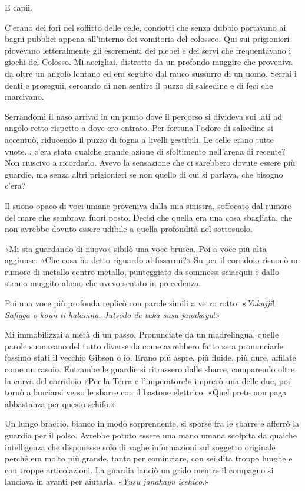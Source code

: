 E capii.

C'erano dei fori nel soffitto delle celle, condotti che senza dubbio
portavano ai bagni pubblici appena all'interno dei vomitoria del
colosseo. Qui sui prigionieri piovevano letteralmente gli escrementi dei
plebei e dei servi che frequentavano i giochi del Colosso. Mi accigliai,
distratto da un profondo muggire che proveniva da oltre un angolo
lontano ed era seguito dal rauco sussurro di un uomo. Serrai i denti e
proseguii, cercando di non sentire il puzzo di salsedine e di feci che
marcivano.

Serrandomi il naso arrivai in un punto dove il percorso si divideva sui
lati ad angolo retto rispetto a dove ero entrato. Per fortuna l'odore di
salsedine si accentuò, riducendo il puzzo di fogna a livelli gestibili.
Le celle erano tutte vuote... c'era stata qualche grande azione di
sfoltimento nell'arena di recente? Non riuscivo a ricordarlo. Avevo la
sensazione che ci sarebbero dovute essere più guardie, ma senza altri
prigionieri se non quello di cui si parlava, che bisogno c'era?

Il suono opaco di voci umane proveniva dalla mia sinistra, soffocato dal
rumore del mare che sembrava fuori posto. Decisi che quella era una cosa
sbagliata, che non avrebbe dovuto essere udibile a quella profondità nel
sottosuolo.

«Mi sta guardando di nuovo» sibilò una voce brusca. Poi a voce più alta
aggiunse: «Che cosa ho detto riguardo al fissarmi?» Su per il corridoio
risuonò un rumore di metallo contro metallo, punteggiato da sommessi
sciacquii e dallo strano muggito alieno che avevo sentito in precedenza.

Poi una voce più profonda replicò con parole simili a vetro rotto.
«\emph{Yukajji}! \emph{Safigga o-koun ti-halamna}. \emph{Jutsodo de tuka
	susu} \emph{janakayu}!»

Mi immobilizzai a metà di un passo. Pronunciate da un madrelingua,
quelle parole suonavano del tutto diverse da come avrebbero fatto se a
pronunciarle fossimo stati il vecchio Gibson o io. Erano più aspre, più
fluide, più dure, affilate come un rasoio. Entrambe le guardie si
ritrassero dalle sbarre, comparendo oltre la curva del corridoio «Per la
Terra e l'imperatore!» imprecò una delle due, poi tornò a lanciarsi
verso le sbarre con il bastone elettrico. «Quel prete non paga
abbastanza per questo schifo.»

Un lungo braccio, bianco in modo sorprendente, si sporse fra le sbarre e
afferrò la guardia per il polso. Avrebbe potuto essere una mano umana
scolpita da qualche intelligenza che disponesse solo di vaghe
informazioni sul soggetto originale perché era molto più grande, tanto
per cominciare, con sei dita troppo lunghe e con troppe articolazioni.
La guardia lanciò un grido mentre il compagno si lanciava in avanti per
aiutarla. «\emph{Yusu janakayu icehico}.»

